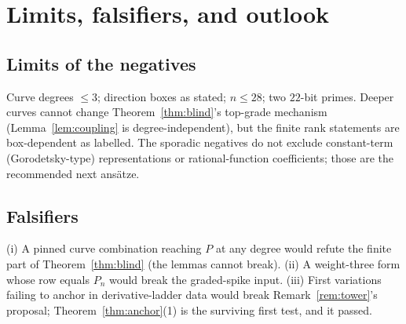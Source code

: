 \documentclass[11pt,reqno]{amsart}
\theoremstyle{plain}
\theoremstyle{definition}
\theoremstyle{remark}
\begin{document}
\section{Limits, falsifiers, and outlook}\label{sec:limits}

\subsection{Limits of the negatives}
Curve degrees $\le3$; direction boxes as stated; $n\le28$; two $22$-bit
primes. Deeper curves cannot change Theorem~\ref{thm:blind}'s top-grade
mechanism (Lemma~\ref{lem:coupling} is degree-independent), but the finite
rank statements are box-dependent as labelled. The sporadic negatives do not
exclude constant-term (Gorodetsky-type) representations or
rational-function coefficients; those are the recommended next ans\"atze.

\subsection{Falsifiers}
(i) A pinned curve combination reaching $P$ at any degree would refute the
finite part of Theorem~\ref{thm:blind} (the lemmas cannot break).
(ii) A weight-three form whose row equals $P_n$ would break the graded-spike
input. (iii) First variations failing to anchor in derivative-ladder data
would break Remark~\ref{rem:tower}'s proposal; Theorem~\ref{thm:anchor}(1)
is the surviving first test, and it passed.
\end{document}
